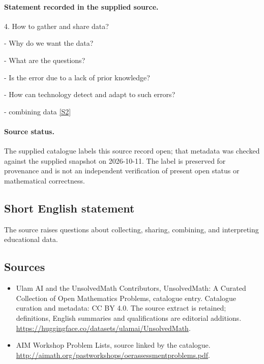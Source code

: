 \documentclass[11pt]{article}
\begin{document}
\paragraph{Statement recorded in the supplied source.}
4. How to gather and share data?

- Why do we want the data?

- What are the questions?

- Is the error due to a lack of prior knowledge?

- How can technology detect and adapt to such errors?

- combining data \href{http://aimath.org/pastworkshops/oerassessmentproblems.pdf}{[S2]}
\paragraph{Source status.}
The supplied catalogue labels this source record open; that metadata was checked against the supplied snapshot on 2026-10-11. The label is preserved for provenance and is not an independent verification of present open status or mathematical correctness.
\subsection{Short English statement}
The source raises questions about collecting, sharing, combining, and interpreting educational data.
\subsection{Sources}
\begin{itemize}
\item[S1] Ulam AI and the UnsolvedMath Contributors, UnsolvedMath: A Curated Collection of Open Mathematics Problems, catalogue entry. Catalogue curation and metadata: CC BY 4.0. The source extract is retained; definitions, English summaries and qualifications are editorial additions.
\url{https://huggingface.co/datasets/ulamai/UnsolvedMath}.
\item[S2] AIM Workshop Problem Lists, source linked by the catalogue.
\url{http://aimath.org/pastworkshops/oerassessmentproblems.pdf}.
\end{itemize}
\end{document}
